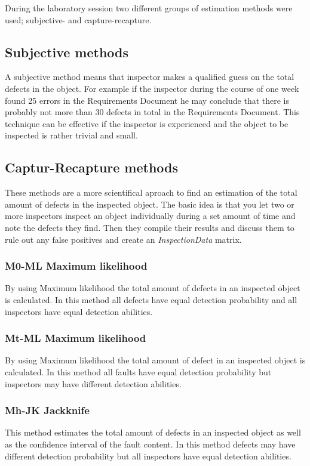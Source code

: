 During the laboratory session two different groups of estimation methods were used; subjective- and capture-recapture.

\subsection{Subjective methods}
A subjective method means that inspector makes a qualified guess on the total defects in the object. 
For example if the inspector during the course of one week found 25 errors in the Requirements Document he may conclude that there is probably not more than 30 defects in total in the Requirements Document.
This technique can be effective if the inspector is experienced and the object to be inspected is rather trivial and small.
\subsection{Captur-Recapture methods}
These methods are a more scientifical aproach to find an estimation of the total amount of defects in the inspected object.
The basic idea is that you let two or more inspectors inspect an object individually during a set amount of time and note the defects they find.
Then they compile their results and discuss them to rule out any false positives and create an \textit{InspectionData} matrix.

\subsubsection{M0-ML Maximum likelihood}
By using Maximum likelihood the total amount of defects in an inspected object is calculated. 
In this method all defects have equal detection probability and all inspectors have equal detection abilities.
\subsubsection{Mt-ML Maximum likelihood}
By using Maximum likelihood the total amount of defect in an inspected object is calculated. 
In this method all faults have equal detection probability but inspectors may have different detection abilities.
\subsubsection{Mh-JK Jackknife}
This method estimates the total amount of defects in an inspected object as well as the confidence interval of the fault content. 
In this method defects may have different detection probability but all inspectors have equal detection abilities. 
